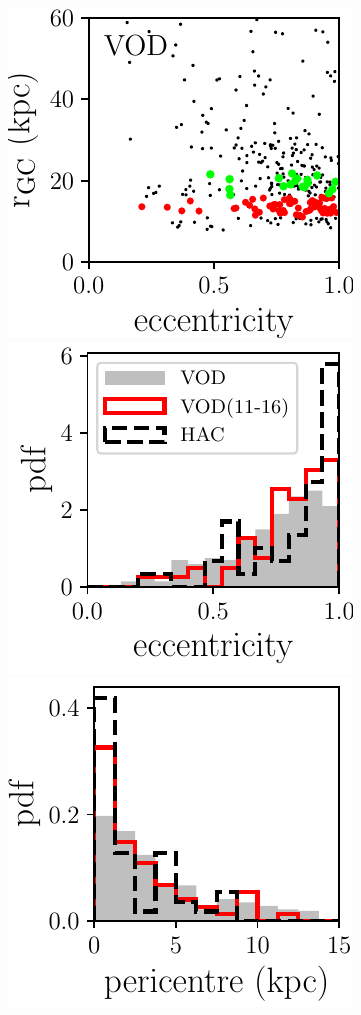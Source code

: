 \documentclass[fleqn,usenatbib]{mnras}
\begin{document}
\begin{figure}
  \includegraphics[scale=0.473]{VOD_orbits_ecc_r.pdf} 
              \includegraphics[scale=0.473]{eccentricities.pdf} 
    \includegraphics[scale=0.473]{pericentres.pdf} 

\end{figure}
\end{document}
